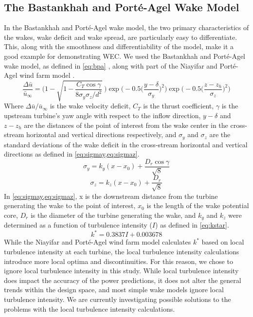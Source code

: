 \documentclass[a4paper]{jpconf}
\begin{document}
\subsection{The Bastankhah and Port\'e-Agel Wake Model}
In the Bastankhah and Port\'e-Agel wake model, the two primary characteristics of the wakes, wake deficit and wake spread, are particularly easy to differentiate. This, along with the smoothness and differentiability of the model, make it a good example for demonstrating WEC. We used the Bastankhah and Port\'e-Agel wake model, as defined in \cref{eq:bpa} \cite{bastankhah2016}, along with part of the Niayifar and Port\'e-Agel wind farm model \cite{niayifar2016}. 
%
\begin{equation}
	\frac{\Delta \bar{u}}{\bar{u}_{\infty}} = \Bigg(1-\sqrt{1-\frac{C_T \cos{\gamma}}{8 \sigma_y \sigma_z/d^2}}~\Bigg) \exp{\bigg(-0.5\Big(\frac{y-\delta}{\sigma_y}\Big)^2\bigg)}\exp{\bigg(-0.5\Big(\frac{z-z_h}{\sigma_z}\Big)^2\bigg)}
	 \label{eq:bpa}
\end{equation}
%
Where $\Delta \bar{u} / \bar{u}_{\infty}$ is the wake velocity deficit, $C_T$ is the thrust coefficient, $\gamma$ is the upstream turbine's yaw angle with respect to the inflow direction, $y-\delta$ and $z-z_h$ are the distances of the point of interest from the wake center in the cross-stream horizontal and vertical directions respectively, and $\sigma_y$ and $\sigma_z$ are the standard deviations of the wake deficit in the cross-stream horizontal and vertical directions as defined in \cref{eq:sigmay,eq:sigmaz}.
%
\begin{equation}\label{eq:sigmay}
	\sigma_y = k_y (x - x_0) + \frac{D_r \cos{\gamma}}{\sqrt{8}}
\end{equation}
%
\begin{equation}\label{eq:sigmaz}
	\sigma_z = k_z (x - x_0) + \frac{D_r}{\sqrt{8}}
\end{equation}
%
In \cref{eq:sigmay,eq:sigmaz}, x is the downstream distance from the turbine generating the wake to the point of interest, $x_0$ is the length of the wake potential core, $D_r$ is the diameter of the turbine generating the wake, and $k_y$ and $k_z$ were determined as a function of turbulence intensity ($I$) as defined in \cref{eq:kstar}\cite{niayifar2016}.
%
\begin{equation}\label{eq:kstar}
	k^* = 0.3837I + 0.003678
\end{equation}
%
While the Niayifar and Port\'e-Agel wind farm model calculates $k^*$ based on local turbulence intensity at each turbine, the local turbulence intensity calculations introduce more local optima and discontinuities. For this reason, we chose to ignore local turbulence intensity in this study. While local turbulence intensity does impact the accuracy of the power predictions, it does not alter the general trends within the design space, and most simple wake models ignore local turbulence intensity. We are currently investigating possible solutions to the problems with the local turbulence intensity calculations.
\end{document}
